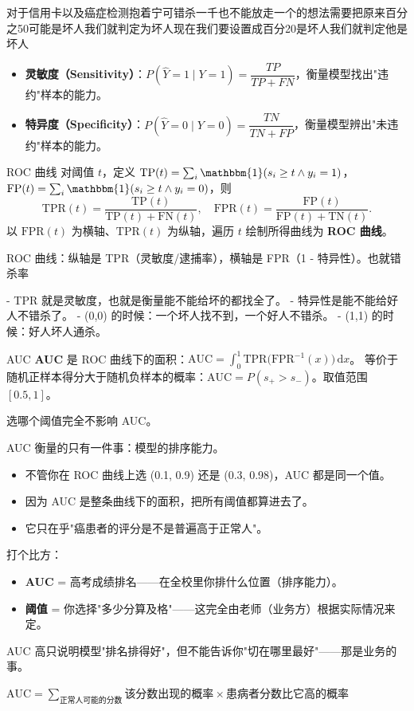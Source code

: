 \begin{dxtips}
    对于信用卡以及癌症检测抱着宁可错杀一千也不能放走一个的想法需要把原来百分之50可能是坏人我们就判定为坏人现在我们要设置成百分20是坏人我们就判定他是坏人
\end{dxtips}
\begin{itemize}
    \item \textbf{灵敏度（Sensitivity）}：$P(\hat{Y}=1 \mid Y=1) = \dfrac{TP}{TP+FN}$，衡量模型找出"违约"样本的能力。
    \item \textbf{特异度（Specificity）}：$P(\hat{Y}=0 \mid Y=0) = \dfrac{TN}{TN+FP}$，衡量模型辨出"未违约"样本的能力。
\end{itemize}
\begin{definition}{ROC 曲线}
对阈值 $t$，定义 $\text{TP}(t)=\sum_i\mathbbm{1}(s_i\ge t\land y_i=1)$，
$\text{FP}(t)=\sum_i\mathbbm{1}(s_i\ge t\land y_i=0)$，则
\[
\text{TPR}(t)=\frac{\text{TP}(t)}{\text{TP}(t)+\text{FN}(t)},\quad
\text{FPR}(t)=\frac{\text{FP}(t)}{\text{FP}(t)+\text{TN}(t)}.
\]
以 $\text{FPR}(t)$ 为横轴、$\text{TPR}(t)$ 为纵轴，遍历 $t$ 绘制所得曲线为 \textbf{ROC 曲线}。
\end{definition}
\begin{dxtips}
ROC 曲线：纵轴是 TPR（灵敏度/逮捕率），横轴是 FPR（1 - 特异性）。也就错杀率

- TPR 就是灵敏度，也就是衡量能不能给坏的都找全了。
- 特异性是能不能给好人不错杀了。
- (0,0) 的时候：一个坏人找不到，一个好人不错杀。
- (1,1) 的时候：好人坏人通杀。
\end{dxtips}
\begin{definition}{AUC}
\textbf{AUC} 是 ROC 曲线下的面积：$\displaystyle\text{AUC}=\int_0^1\text{TPR}\big(\text{FPR}^{-1}(x)\big)\,\mathrm{d}x$。
等价于随机正样本得分大于随机负样本的概率：$\text{AUC}=P(s_+>s_-)$。取值范围 $[0.5,1]$。
\end{definition}
\begin{note}
选哪个阈值完全不影响 AUC。

AUC 衡量的只有一件事：模型的排序能力。
\begin{itemize}
    \item 不管你在 ROC 曲线上选 (0.1, 0.9) 还是 (0.3, 0.98)，AUC 都是同一个值。
    \item 因为 AUC 是整条曲线下的面积，把所有阈值都算进去了。
    \item 它只在乎"癌患者的评分是不是普遍高于正常人"。
\end{itemize}

打个比方：
\begin{itemize}
    \item \textbf{AUC} = 高考成绩排名——在全校里你排什么位置（排序能力）。
    \item \textbf{阈值} = 你选择"多少分算及格"——这完全由老师（业务方）根据实际情况来定。
\end{itemize}

AUC 高只说明模型"排名排得好"，但不能告诉你"切在哪里最好"——那是业务的事。
\end{note}
\begin{dxtips}
    $\displaystyle \text{AUC} = \sum_{\text{正常人可能的分数}} \text{该分数出现的概率} \times \text{患病者分数比它高的概率}$
\end{dxtips}
